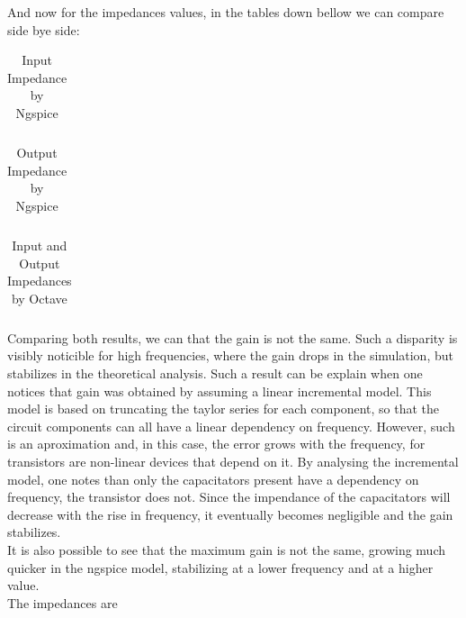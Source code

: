 And now for the impedances values, in the tables down bellow we can compare side bye side:
\FloatBarrier
\begin{table}[h]
  \centering
  \begin{tabular}{|c|}
    \hline    
    
    \hline
  \end{tabular}
  \caption{Input Impedance by Ngspice}
  \label{tab:Spice1}
\end{table}
\FloatBarrier   

\FloatBarrier
\begin{table}[h]
  \centering
  \begin{tabular}{|c|}
    \hline    
    
    \hline
  \end{tabular}
  \caption{Output Impedance by Ngspice}
  \label{tab:Spice1}
\end{table}
\FloatBarrier   

\FloatBarrier
\begin{table}[h]
  \centering
  \begin{tabular}{|c|c|}
    \hline    
    
    \hline
  \end{tabular}
  \caption{Input and Output Impedances by Octave}
  \label{tab:Spice1}
\end{table}
\FloatBarrier   


Comparing both results, we can that the gain is not the same. Such a disparity is visibly noticible for high frequencies, where the gain drops in the simulation, but stabilizes in the theoretical analysis. Such a result can be explain when one notices that gain was obtained by assuming a linear incremental model. This model is based on truncating the taylor series for each component, so that the circuit components can all have a linear dependency on frequency. However, such is an aproximation and, in this case, the error grows with the frequency, for transistors are non-linear devices that depend on it. By analysing the incremental model, one notes than only the capacitators present have a dependency on frequency, the transistor does not. Since the impendance of the capacitators will decrease with the rise in frequency, it eventually becomes negligible and the gain stabilizes.\\
It is also possible to see that the maximum gain is not the same, growing much quicker in the ngspice model, stabilizing at a lower frequency and at a higher value.\\
The impedances are 





